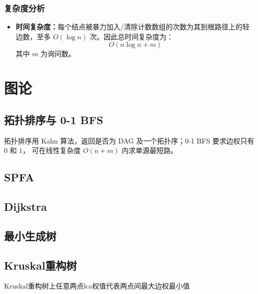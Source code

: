\documentclass[11pt,a4paper,twocolumn]{ctexart}  %
\begin{document}
\subsubsection*{复杂度分析}

\begin{itemize}
    \item \textbf{时间复杂度：}每个结点被暴力加入/清除计数数组的次数为其到根路径上的轻边数，至多 $O(\log n)$ 次。因此总时间复杂度为：
    \[
        O(n \log n + m)
    \]
    其中 $m$ 为询问数。

\end{itemize}


\clearpage
\section{图论}
\subsection{拓扑排序与 0-1 BFS}
拓扑排序用 Kahn 算法，返回是否为 DAG 及一个拓扑序；0-1 BFS 要求边权只有 $0$ 和 $1$，
可在线性复杂度 $O(n+m)$ 内求单源最短路。


\subsection{SPFA}




\subsection{Dijkstra}




\subsection{最小生成树}




\subsection{Kruskal重构树}
Kruskal重构树上任意两点lca权值代表两点间最大边权最小值

\end{document}
